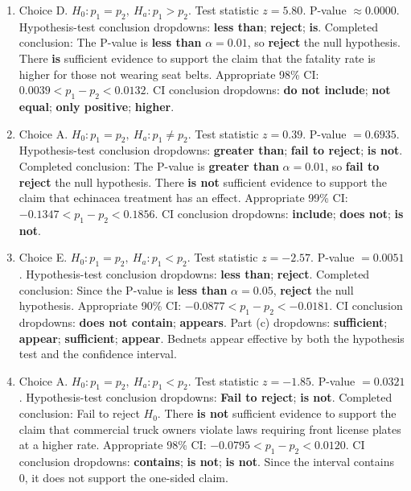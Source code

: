 \documentclass[11pt]{article}
\begin{document}
\begin{enumerate}[leftmargin=*]
\item Choice D. \(H_0:p_1=p_2,\ H_a:p_1>p_2\). Test statistic \(z=5.80\). P-value \(\approx0.0000\). Hypothesis-test conclusion dropdowns: \textbf{less than}; \textbf{reject}; \textbf{is}. Completed conclusion: The P-value is \textbf{less than} \(\alpha=0.01\), so \textbf{reject} the null hypothesis. There \textbf{is} sufficient evidence to support the claim that the fatality rate is higher for those not wearing seat belts. Appropriate 98\% CI: \(0.0039 < p_1-p_2 < 0.0132\). CI conclusion dropdowns: \textbf{do not include}; \textbf{not equal}; \textbf{only positive}; \textbf{higher}.

\item Choice A. \(H_0:p_1=p_2,\ H_a:p_1\ne p_2\). Test statistic \(z=0.39\). P-value \(=0.6935\). Hypothesis-test conclusion dropdowns: \textbf{greater than}; \textbf{fail to reject}; \textbf{is not}. Completed conclusion: The P-value is \textbf{greater than} \(\alpha=0.01\), so \textbf{fail to reject} the null hypothesis. There \textbf{is not} sufficient evidence to support the claim that echinacea treatment has an effect. Appropriate 99\% CI: \(-0.1347 < p_1-p_2 < 0.1856\). CI conclusion dropdowns: \textbf{include}; \textbf{does not}; \textbf{is not}.

\item Choice E. \(H_0:p_1=p_2,\ H_a:p_1<p_2\). Test statistic \(z=-2.57\). P-value \(=0.0051\). Hypothesis-test conclusion dropdowns: \textbf{less than}; \textbf{reject}. Completed conclusion: Since the P-value is \textbf{less than} \(\alpha=0.05\), \textbf{reject} the null hypothesis. Appropriate 90\% CI: \(-0.0877 < p_1-p_2 < -0.0181\). CI conclusion dropdowns: \textbf{does not contain}; \textbf{appears}. Part (c) dropdowns: \textbf{sufficient}; \textbf{appear}; \textbf{sufficient}; \textbf{appear}. Bednets appear effective by both the hypothesis test and the confidence interval.

\item Choice A. \(H_0:p_1=p_2,\ H_a:p_1<p_2\). Test statistic \(z=-1.85\). P-value \(=0.0321\). Hypothesis-test conclusion dropdowns: \textbf{Fail to reject}; \textbf{is not}. Completed conclusion: Fail to reject \(H_0\). There \textbf{is not} sufficient evidence to support the claim that commercial truck owners violate laws requiring front license plates at a higher rate. Appropriate 98\% CI: \(-0.0795<p_1-p_2<0.0120\). CI conclusion dropdowns: \textbf{contains}; \textbf{is not}; \textbf{is not}. Since the interval contains 0, it does not support the one-sided claim.


\end{enumerate}
\end{document}
